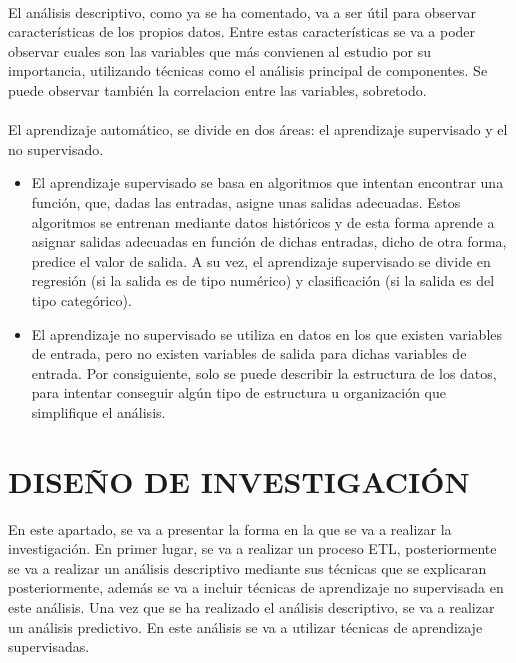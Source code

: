 \documentclass[spanish,12pt, a4paper,twoside]{paper}
\let\oldsection\section
\def\section{\cleardoublepage\oldsection}
\begin{document}
\paragraph{}
El análisis descriptivo, como ya se ha comentado, va a ser útil para observar características de los propios datos. Entre estas características se va a poder observar cuales son las variables que más convienen al estudio por su importancia, utilizando técnicas como el análisis principal de componentes. Se puede observar también la correlacion entre las variables, sobretodo.
\paragraph{}
El aprendizaje automático, se divide en dos áreas: el aprendizaje supervisado y el no supervisado. 

\begin{itemize}
\item El aprendizaje supervisado se basa en algoritmos que intentan encontrar una función, que, dadas las entradas, asigne unas salidas adecuadas. Estos algoritmos se entrenan mediante datos históricos y de esta forma aprende a asignar salidas adecuadas en función de dichas entradas, dicho de otra forma, predice el valor de salida. A su vez, el aprendizaje supervisado se divide en regresión (si la salida es de tipo numérico) y clasificación (si la salida es del tipo categórico). \cite{Recuero2017}
\item El aprendizaje no supervisado se utiliza en datos en los que existen variables de entrada, pero no existen variables de salida para dichas variables de entrada. Por consiguiente, solo se puede describir la estructura de los datos, para intentar conseguir algún tipo de estructura u organización que simplifique el análisis.\cite{Recuero2017}
\end{itemize}


\section{DISEÑO DE INVESTIGACIÓN}
En este apartado, se va a presentar la forma en la que se va a realizar la investigación. En primer lugar, se va a realizar un proceso ETL, posteriormente se va a realizar un análisis descriptivo mediante sus técnicas que se explicaran posteriormente, además se va a incluir técnicas de aprendizaje no supervisada en este análisis.
Una vez que se ha realizado el análisis descriptivo, se va a realizar un análisis predictivo. En este análisis se va a utilizar técnicas de aprendizaje supervisadas.
\end{document}
